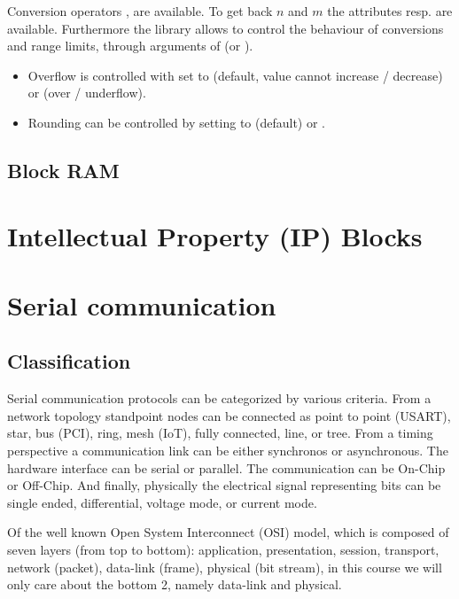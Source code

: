 \documentclass[margin=small]{tex/hsrzf}
\begin{document}
Conversion operators ,  are available. To get back \(n\) and \(m\) the attributes  resp.  are available. Furthermore the library allows to control the behaviour of conversions and range limits, through arguments of  (or ).
\begin{itemize}
  \item Overflow is controlled with  set to  (default, value cannot increase / decrease) or  (over / underflow).
  \item Rounding can be controlled by setting  to  (default) or .
\end{itemize}

\subsection{Block RAM}


\section{Intellectual Property (IP) Blocks}

\section{Serial communication}

\subsection{Classification}

Serial communication protocols can be categorized by various criteria. From a network topology standpoint nodes can be connected as point to point (USART), star, bus (PCI), ring, mesh (IoT), fully connected, line, or tree. From a timing perspective a communication link can be either synchronos or asynchronous. The hardware interface can be serial or parallel. The communication can be On-Chip or Off-Chip. And finally, physically the electrical signal representing bits can be single ended, differential, voltage mode, or current mode.

Of the well known Open System Interconnect (OSI) model, which is composed of seven layers (from top to bottom): application, presentation, session, transport, network (packet), data-link (frame), physical (bit stream), in this course we will only care about the bottom 2, namely data-link and physical.
\end{document}
